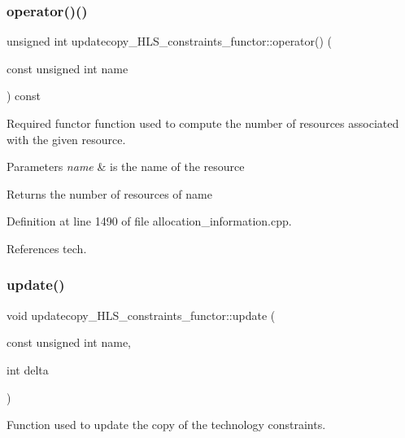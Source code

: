 \subsubsection{\texorpdfstring{operator()()}{operator()()}}
{\footnotesize\ttfamily unsigned int updatecopy\+\_\+\+H\+L\+S\+\_\+constraints\+\_\+functor\+::operator() (\begin{DoxyParamCaption}\item[{const unsigned int}]{name }\end{DoxyParamCaption}) const}



Required functor function used to compute the number of resources associated with the given resource. 


\begin{DoxyParams}{Parameters}
{\em name} & is the name of the resource \\
\hline
\end{DoxyParams}
\begin{DoxyReturn}{Returns}
the number of resources of name 
\end{DoxyReturn}


Definition at line 1490 of file allocation\+\_\+information.\+cpp.



References tech.

\mbox{\label{structupdatecopy__HLS__constraints__functor_a4d926dfe5bd3421102d4637577b47956}} 
\subsubsection{\texorpdfstring{update()}{update()}}
{\footnotesize\ttfamily void updatecopy\+\_\+\+H\+L\+S\+\_\+constraints\+\_\+functor\+::update (\begin{DoxyParamCaption}\item[{const unsigned int}]{name,  }\item[{int}]{delta }\end{DoxyParamCaption})}



Function used to update the copy of the technology constraints. 



